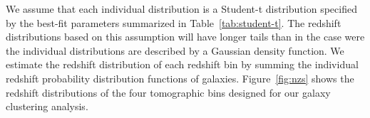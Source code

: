 \documentclass{aa}
\numberwithin{equation}{section}
\begin{document}


We assume that each individual distribution is a Student-t distribution specified by the best-fit parameters summarized in Table~\ref{tab:student-t}. The redshift distributions based on this assumption will have longer tails than in the case were the individual distributions are described by a Gaussian density function. 
We estimate the redshift distribution of each redshift bin by summing the individual redshift probability distribution functions of galaxies.
Figure~\ref{fig:nzs} shows the redshift distributions of the four tomographic bins designed for our galaxy clustering analysis.

\end{document}
